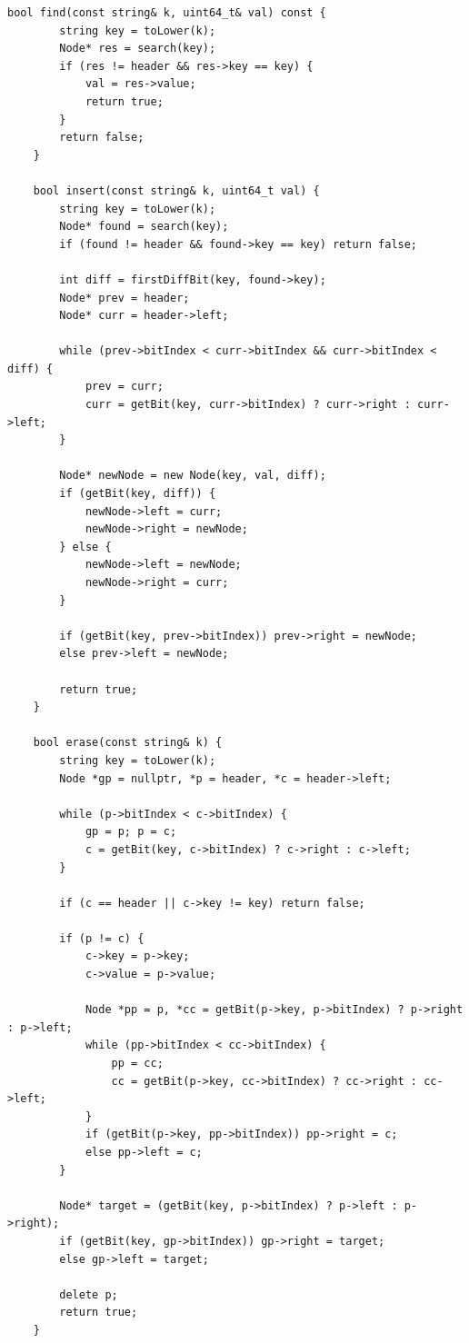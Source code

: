 \begin{lstlisting}[breaklines=true, postbreak=\mbox{\textcolor{red}{$\hookrightarrow$}\space}]
    bool find(const string& k, uint64_t& val) const {
        string key = toLower(k);
        Node* res = search(key);
        if (res != header && res->key == key) {
            val = res->value;
            return true;
        }
        return false;
    }

    bool insert(const string& k, uint64_t val) {
        string key = toLower(k);
        Node* found = search(key);
        if (found != header && found->key == key) return false;

        int diff = firstDiffBit(key, found->key);
        Node* prev = header;
        Node* curr = header->left;

        while (prev->bitIndex < curr->bitIndex && curr->bitIndex < diff) {
            prev = curr;
            curr = getBit(key, curr->bitIndex) ? curr->right : curr->left;
        }

        Node* newNode = new Node(key, val, diff);
        if (getBit(key, diff)) {
            newNode->left = curr;
            newNode->right = newNode;
        } else {
            newNode->left = newNode;
            newNode->right = curr;
        }

        if (getBit(key, prev->bitIndex)) prev->right = newNode;
        else prev->left = newNode;

        return true;
    }

    bool erase(const string& k) {
        string key = toLower(k);
        Node *gp = nullptr, *p = header, *c = header->left;

        while (p->bitIndex < c->bitIndex) {
            gp = p; p = c;
            c = getBit(key, c->bitIndex) ? c->right : c->left;
        }

        if (c == header || c->key != key) return false;

        if (p != c) {
            c->key = p->key;
            c->value = p->value;

            Node *pp = p, *cc = getBit(p->key, p->bitIndex) ? p->right : p->left;
            while (pp->bitIndex < cc->bitIndex) {
                pp = cc;
                cc = getBit(p->key, cc->bitIndex) ? cc->right : cc->left;
            }
            if (getBit(p->key, pp->bitIndex)) pp->right = c;
            else pp->left = c;
        }

        Node* target = (getBit(key, p->bitIndex) ? p->left : p->right);
        if (getBit(key, gp->bitIndex)) gp->right = target;
        else gp->left = target;

        delete p;
        return true;
    }


\end{lstlisting}
